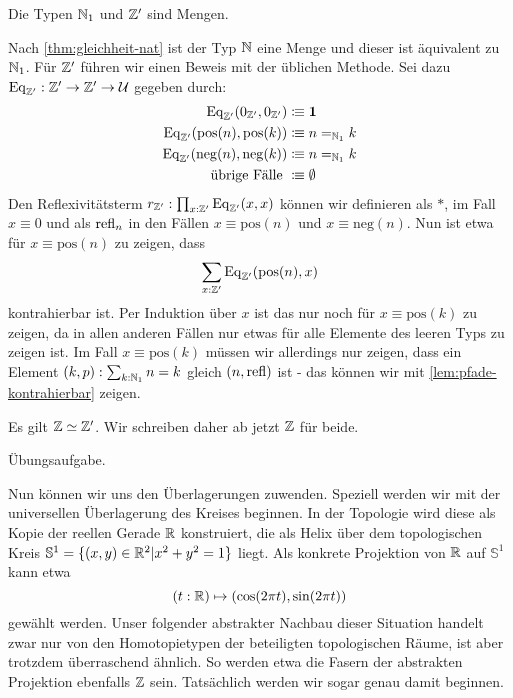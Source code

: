 \begin{bemerkung}
  Die Typen $\mathbb{N}_1$ und $\mathbb{Z}'$ sind Mengen.
\end{bemerkung}
\begin{beweis}
  Nach \cref{thm:gleichheit-nat} ist der Typ $\mathbb{N}$ eine Menge und dieser ist äquivalent zu $\mathbb{N}_1$.
  Für $\mathbb{Z}'$ führen wir einen Beweis mit der üblichen Methode. Sei dazu $\mathrm{Eq}_{\mathbb{Z}'}:\mathbb{Z}'\to\mathbb{Z}'\to\mathcal{U}$ gegeben durch:
  \begin{align*}
    \mathrm{Eq}_{\mathbb{Z}'}(0_{\mathbb{Z}'},0_{\mathbb{Z}'})&\vcentcolon\mspace{-1.2mu}\equiv \mathbf{1} \\
    \mathrm{Eq}_{\mathbb{Z}'}(\mathrm{pos}(n),\mathrm{pos}(k))&\vcentcolon\mspace{-1.2mu}\equiv n=_{\mathbb{N}_1}k \\
    \mathrm{Eq}_{\mathbb{Z}'}(\mathrm{neg}(n),\mathrm{neg}(k))&\vcentcolon\mspace{-1.2mu}\equiv n=_{\mathbb{N}_1}k \\
    \text{übrige Fälle }&\vcentcolon\mspace{-1.2mu}\equiv \emptyset
  \end{align*}
  Den Reflexivitätsterm $r_{\mathbb{Z}'}:\prod_{x:\mathbb{Z}'}\mathrm{Eq}_{\mathbb{Z}'}(x,x)$ können wir definieren als $\ast$, im Fall $x\equiv 0$ und als $\mathrm{refl}_{n}$ in den Fällen $x\equiv \mathrm{pos}(n)$ und $x\equiv \mathrm{neg}(n)$.
  Nun ist etwa für $x\equiv \mathrm{pos}(n)$ zu zeigen, dass
  \[
    \sum_{x:\mathbb{Z}'}\mathrm{Eq}_{\mathbb{Z}'}(\mathrm{pos}(n),x)
  \]
  kontrahierbar ist. Per Induktion über $x$ ist das nur noch für $x\equiv \mathrm{pos}(k)$ zu zeigen, da in allen anderen Fällen nur etwas für alle Elemente des leeren Typs zu zeigen ist.
  Im Fall $x\equiv \mathrm{pos}(k)$ müssen wir allerdings nur zeigen, dass ein Element $(k,p):\sum_{k:\mathbb{N}_1}n=k$ gleich $(n,\mathrm{refl})$ ist - das können wir mit \cref{lem:pfade-kontrahierbar} zeigen.
\end{beweis}

\begin{bemerkung}
  Es gilt $\mathbb{Z}\simeq \mathbb{Z}'$. Wir schreiben daher ab jetzt $\mathbb{Z}$ für beide.
\end{bemerkung}
\begin{beweis}
  Übungsaufgabe.
\end{beweis}

Nun können wir uns den Überlagerungen zuwenden. Speziell werden wir mit der universellen Überlagerung des Kreises beginnen.
In der Topologie wird diese als Kopie der reellen Gerade $\mathbb{R}$ konstruiert, die als Helix über dem topologischen Kreis $\mathbb{S}^1=\{(x,y)\in\mathbb{R}^2\vert x^2+y^2=1\}$ liegt.
Als konkrete Projektion von $\mathbb{R}$ auf $\mathbb{S}^1$ kann etwa
\[
  (t:\mathbb{R}) \mapsto (\cos(2\pi t),\sin(2\pi t))
\]
gewählt werden. Unser folgender abstrakter Nachbau dieser Situation handelt zwar nur von den Homotopietypen der beteiligten topologischen Räume, ist aber trotzdem überraschend ähnlich.
So werden etwa die Fasern der abstrakten Projektion ebenfalls $\mathbb{Z}$ sein.
Tatsächlich werden wir sogar genau damit beginnen.

